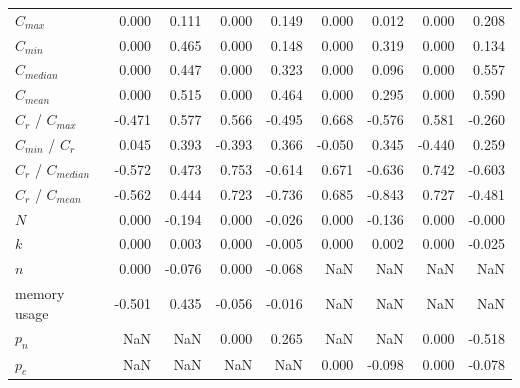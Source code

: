\begin{tabular}{lrrrrrrrr}
$C_{max}$            &    0.000 &        0.111 &                              0.000 &        0.149 &                                 0.000 &        0.012 &                0.000 &        0.208 \\
$C_{min}$            &    0.000 &        0.465 &                              0.000 &        0.148 &                                 0.000 &        0.319 &                0.000 &        0.134 \\
$C_{median}$         &    0.000 &        0.447 &                              0.000 &        0.323 &                                 0.000 &        0.096 &                0.000 &        0.557 \\
$C_{mean}$           &    0.000 &        0.515 &                              0.000 &        0.464 &                                 0.000 &        0.295 &                0.000 &        0.590 \\
$C_r$ / $C_{max}$    &   -0.471 &        0.577 &                              0.566 &       -0.495 &                                 0.668 &       -0.576 &                0.581 &       -0.260 \\
$C_{min}$ / $C_r$    &    0.045 &        0.393 &                             -0.393 &        0.366 &                                -0.050 &        0.345 &               -0.440 &        0.259 \\
$C_r$ / $C_{median}$ &   -0.572 &        0.473 &                              0.753 &       -0.614 &                                 0.671 &       -0.636 &                0.742 &       -0.603 \\
$C_r$ / $C_{mean}$   &   -0.562 &        0.444 &                              0.723 &       -0.736 &                                 0.685 &       -0.843 &                0.727 &       -0.481 \\
$N$                  &    0.000 &       -0.194 &                              0.000 &       -0.026 &                                 0.000 &       -0.136 &                0.000 &       -0.000 \\
$k$                  &    0.000 &        0.003 &                              0.000 &       -0.005 &                                 0.000 &        0.002 &                0.000 &       -0.025 \\
$n$                  &    0.000 &       -0.076 &                              0.000 &       -0.068 &                                   NaN &          NaN &                  NaN &          NaN \\
memory usage         &   -0.501 &        0.435 &                             -0.056 &       -0.016 &                                   NaN &          NaN &                  NaN &          NaN \\
$p_n$                &      NaN &          NaN &                              0.000 &        0.265 &                                   NaN &          NaN &                0.000 &       -0.518 \\
$p_e$                &      NaN &          NaN &                                NaN &          NaN &                                 0.000 &       -0.098 &                0.000 &       -0.078 \\
\bottomrule
\end{tabular}
